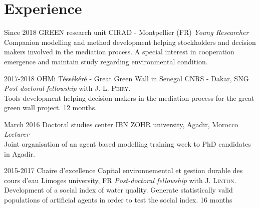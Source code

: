 \documentclass[]{cv-etienne}
\begin{document}
\section{Experience}
\begin{entrylist}
\entry
{Since 2018}
{GREEN research unit}
{CIRAD - Montpellier (FR)}
{\emph{Young Researcher}\\
Companion modelling and method development helping stockholders and decision makers involved in the mediation process. A special interest in cooperation emergence and maintain study regarding environmental condition.}
\end{entrylist}
\begin{entrylist}
\entry
{2017-2018}
{OHMi Téssékéré - Great Green Wall in Senegal}
{CNRS - Dakar, SNG}
{\emph{Post-doctoral fellowship} with J.-L. \textsc{Peiry}.\\
Tools development helping decision makers in the mediation process for the great green wall project. 12 months.}
\end{entrylist}
\begin{entrylist}
\entry
{March 2016}
{Doctoral studies center}
{IBN ZOHR university, Agadir, Morocco}
{\emph{Lecturer} \\
 Joint organisation of an agent based modelling training week to PhD candidates in Agadir.}
\end{entrylist}
\begin{entrylist}
\entry
{2015-2017}
{Chaire d'excellence Capital environnemental et gestion durable des cours d’eau}
{Limoges university, FR}
{\emph{Post-doctoral fellowship} with J. \textsc{Linton}. \\
Development of a social index of water quality. Generate statistically valid populations of artificial agents in order to test the social index. 16 months
}
\end{entrylist}
\end{document}
